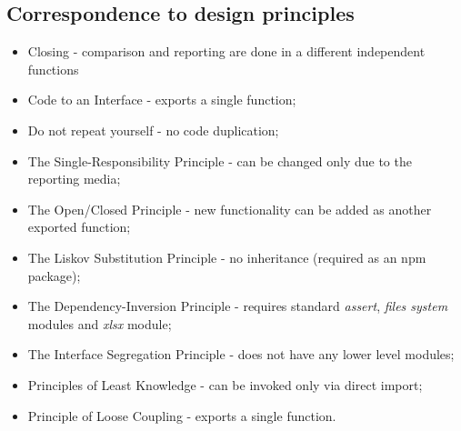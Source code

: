 \subsection{Correspondence to design principles}
\begin{itemize}
	\item Closing - comparison and reporting are done in a different independent functions
	\item Code to an Interface - exports a single function;
	\item Do not repeat yourself - no code duplication;
	\item The Single-Responsibility Principle - can be changed only due to the reporting media;
	\item The Open/Closed Principle - new functionality can be added as another exported function;
	\item The Liskov Substitution Principle - no inheritance (required as an npm package);
	\item The Dependency-Inversion Principle - requires standard \textit{assert}, \textit{files system} modules and \textit{xlsx} module;
	\item The Interface Segregation Principle - does not have any lower level modules;
	\item Principles of Least Knowledge -  can be invoked only via direct import;
	\item Principle of Loose Coupling - exports a single function.
\end{itemize}